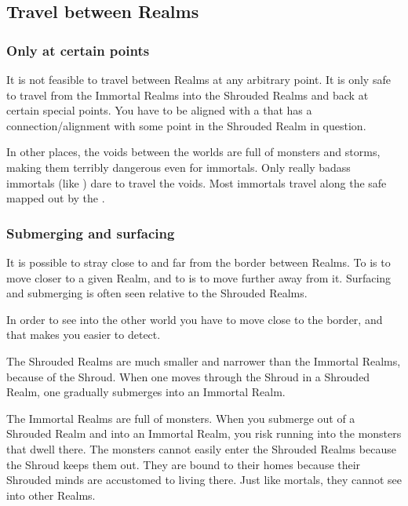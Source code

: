 \subsection{Travel between Realms}





\subsubsection{Only at certain points}
It is not feasible to travel between Realms at any arbitrary point. 
It is only safe to travel from the Immortal Realms into the Shrouded Realms and back at certain special points. 
You have to be aligned with a \matrix{} that has a connection/alignment with some \nexus{} point in the Shrouded Realm in question. 

In other places, the voids between the worlds are full of monsters and storms, making them terribly dangerous even for immortals. 
Only really badass immortals (like \QuessanthIshnaruchaefir) dare to travel the voids. 
Most immortals travel along the safe  mapped out by the \matrices. 





\subsubsection{Submerging and surfacing}
It is possible to stray close to and far from the border between Realms. 
To  is to move closer to a given Realm, and to  is to move further away from it. 
Surfacing and submerging is often seen relative to the Shrouded Realms. 

In order to see into the other world you have to move close to the border, and that makes you easier to detect. 

The Shrouded Realms are much smaller and narrower than the Immortal Realms, because of the Shroud. 
When one moves  through the Shroud in a Shrouded Realm, one gradually submerges into an Immortal Realm. 

The Immortal Realms are full of monsters. 
When you submerge out of a Shrouded Realm and into an Immortal Realm, you risk running into the monsters that dwell there. 
The monsters cannot easily enter the Shrouded Realms because the Shroud keeps them out. 
They are bound to their homes because their Shrouded minds are accustomed to living there. 
Just like mortals, they cannot see into other Realms. 


